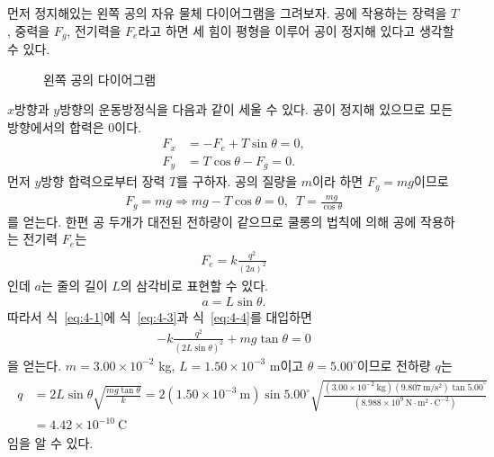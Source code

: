 \documentclass[floatfix,nofootinbib,superscriptaddress,fleqn,notitlepage]{revtex4-2}
\begin{document}
 먼저 정지해있는 왼쪽 공의 자유 물체 다이어그램을 그려보자. 공에 작용하는 장력을 
$T$, 중력을 $F_g$, 전기력을 $F_e$라고 하면 세 힘이 평형을 이루어 공이 정지해 있다고 생각할 수 있다. 
\begin{figure}[htbp]
  \centering
  \caption{왼쪽 공의 다이어그램}
\end{figure}

$x$방향과 $y$방향의 운동방정식을 다음과 같이 세울 수 있다. 공이 정지해 있으므로 모든 방향에서의 합력은
0이다.
\begin{align}
  F_x&= -F_e+T\sin\theta=0,\label{eq:4-1} \\
  F_y&= T\cos\theta-F_g=0.\label{eq:4-2}
\end{align}
먼저 $y$방향 합력으로부터 장력 $T$를 구하자. 공의 질량을 $m$이라 하면 $F_g=mg$이므로
\begin{align}\label{eq:4-3}
  F_g=mg\Longrightarrow mg-T\cos\theta=0,\,\,\,T=\frac{mg}{\cos\theta}
\end{align}
를 얻는다. 한편 공 두개가 대전된 전하량이 같으므로 쿨롱의 법칙에 의해 공에 작용하는 전기력 $F_e$는
\begin{align}
  F_e = k\frac{q^2}{(2a)^2}
\end{align}
인데 $a$는 줄의 길이 $L$의 삼각비로 표현할 수 있다.
\begin{align}\label{eq:4-4}
  a = L\sin\theta.
\end{align}
따라서 식~\ref{eq:4-1}에 식~\ref{eq:4-3}과 식~\ref{eq:4-4}를 대입하면
\begin{align}
  -k\frac{q^2}{(2L\sin\theta)^2}+mg\tan\theta=0
\end{align}
을 얻는다. 
$m=3.00\times 10^{-2}$ kg, $L=1.50\times 10^{-3}$ m이고 $\theta=5.00^\circ$이므로
전하량 $q$는
\begin{align}
  \begin{split}
    q &= 2L\sin\theta\sqrt{\frac{mg\tan\theta}{k}}
    =2(1.50\times 10^{-3}~\mathrm{m})\sin 5.00^\circ
    \sqrt{\frac{(3.00\times 10^{-2}~\mathrm{kg})(9.807~\mathrm{m/s^2})\tan 5.00^\circ}
    {(8.988\times 10^{9}~\mathrm{N\cdot m^2\cdot C^{-2}})}} \\
    &= 4.42\times 10^{-10}~\mathrm{C}
  \end{split}
\end{align}
임을 알 수 있다.
\end{document}
